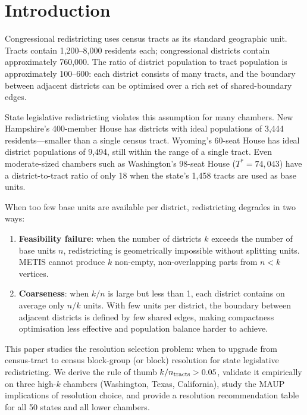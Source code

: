 \section{Introduction}
\label{sec:intro}

Congressional redistricting uses census tracts as its standard geographic unit.
Tracts contain 1,200--8,000 residents each; congressional districts contain
approximately 760,000. The ratio of district population to tract population
is approximately 100--600: each district consists of many tracts, and the
boundary between adjacent districts can be optimised over a rich set of
shared-boundary edges.

State legislative redistricting violates this assumption for many chambers.
New Hampshire's 400-member House has districts with ideal populations of 3,444
residents---smaller than a single census tract. Wyoming's 60-seat House has
ideal district populations of 9,494, still within the range of a single tract.
Even moderate-sized chambers such as Washington's 98-seat House ($T^* = 74,043$)
have a district-to-tract ratio of only 18 when the state's 1,458 tracts are
used as base units.

When too few base units are available per district, redistricting degrades in
two ways:
\begin{enumerate}
  \item \textbf{Feasibility failure}: when the number of districts $k$ exceeds
    the number of base units $n$, redistricting is geometrically impossible
    without splitting units. METIS cannot produce $k$ non-empty, non-overlapping
    parts from $n < k$ vertices.
  \item \textbf{Coarseness}: when $k/n$ is large but less than 1,
    each district contains on average only $n/k$ units. With few units per
    district, the boundary between adjacent districts is defined by few shared
    edges, making compactness optimisation less effective and population balance
    harder to achieve.
\end{enumerate}

This paper studies the resolution selection problem: when to upgrade from
census-tract to census block-group (or block) resolution for state legislative
redistricting. We derive the rule of thumb $k/n_{\rm tracts} > 0.05$, validate
it empirically on three high-$k$ chambers (Washington, Texas, California),
study the MAUP implications of resolution choice, and provide a resolution
recommendation table for all 50 states and all lower chambers.

